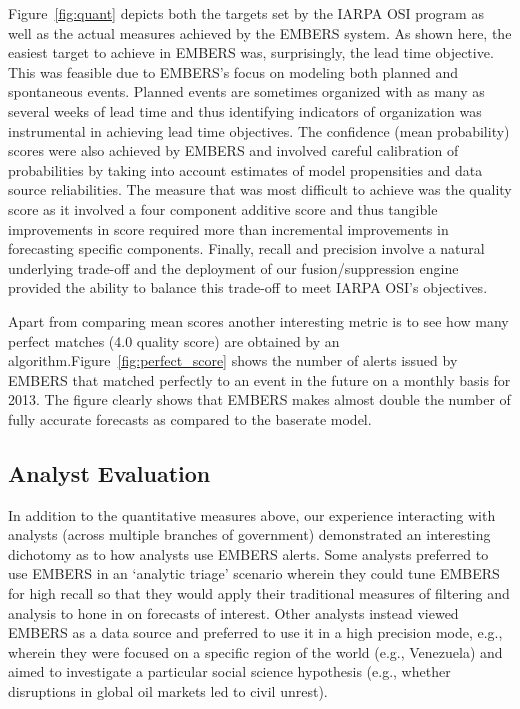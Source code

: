 \documentclass[11pt,a4paper,extrafontsizes,oneside]{article}
\begin{document}
Figure~\ref{fig:quant} depicts both the targets set by the IARPA OSI program as well as the
actual measures achieved by the EMBERS system. As shown here, the easiest target to achieve
in EMBERS was, surprisingly, the lead time objective. This was feasible due to EMBERS's focus on modeling
both planned and spontaneous events. Planned events are sometimes organized with as many as several weeks
of lead time and thus identifying indicators of organization was instrumental in achieving
lead time objectives. The confidence (mean probability) scores were also achieved by EMBERS and involved
careful calibration of probabilities by taking into account estimates of
model propensities and data source reliabilities. The measure that was most difficult to achieve
was the quality score as it involved a four component additive score and thus tangible improvements in
score required more than incremental improvements in forecasting specific components. Finally, recall
and precision involve a natural underlying trade-off and the deployment of our fusion/suppression
engine provided the ability to balance this trade-off to meet IARPA OSI's objectives.

Apart from comparing mean scores another interesting metric is to see
how many perfect matches (4.0 quality score) are obtained by an
algorithm.Figure~\ref{fig:perfect_score} shows the number of alerts issued
by EMBERS that matched perfectly to an event in the future on a monthly
basis for 2013.  The figure clearly shows that EMBERS makes almost double
the number of fully accurate forecasts as compared to the baserate
model.


\subsection{Analyst Evaluation}
In addition to the quantitative measures above, our experience interacting with analysts (across multiple
branches of government) demonstrated
an interesting dichotomy as to how analysts use EMBERS alerts. Some analysts preferred to use EMBERS in an
`analytic triage' scenario wherein they could tune EMBERS for high recall so that they would apply their
traditional measures of filtering and analysis to hone in on forecasts of interest. Other analysts
instead viewed EMBERS as a data source and preferred to use it in a high precision mode, e.g., wherein they
were focused on a specific region of the world (e.g., Venezuela) and aimed to investigate a particular
social science hypothesis (e.g., whether disruptions in global oil markets led to civil unrest).
\end{document}
